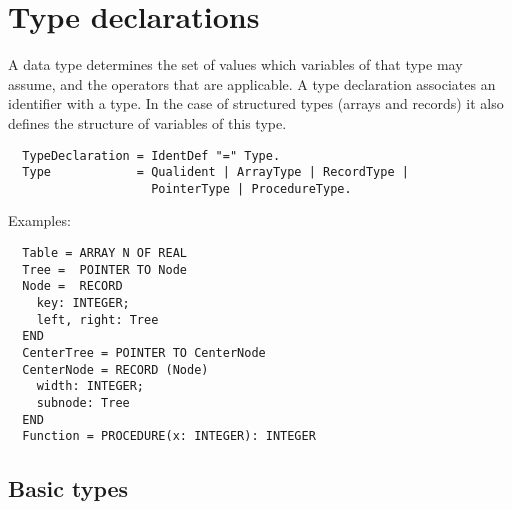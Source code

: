 \section{Type declarations}\label{o2r:type:dcl}

A data type determines the set of values which variables of that type
may assume, and the operators that are applicable. A type declaration
associates an identifier with a type. In the case of structured types
(arrays and records) it also defines the structure of variables of
this type.
{\BNFsize
\begin{verbatim}
  TypeDeclaration = IdentDef "=" Type.
  Type            = Qualident | ArrayType | RecordType |
                    PointerType | ProcedureType.
\end{verbatim}}

\noindent
Examples:
\begin{verbatim}
  Table = ARRAY N OF REAL
  Tree =  POINTER TO Node
  Node =  RECORD
    key: INTEGER;
    left, right: Tree
  END
  CenterTree = POINTER TO CenterNode
  CenterNode = RECORD (Node)
    width: INTEGER;
    subnode: Tree
  END
  Function = PROCEDURE(x: INTEGER): INTEGER
\end{verbatim}

\subsection{Basic types}\label{o2r:basic:types}

